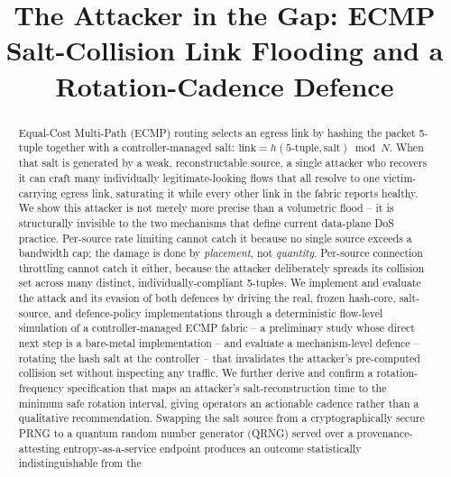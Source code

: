 \documentclass[conference]{IEEEtran}
\begin{document}
\title{The Attacker in the Gap: ECMP Salt-Collision Link Flooding and a Rotation-Cadence Defence}

\author{
}

\maketitle

\begin{abstract}
Equal-Cost Multi-Path (ECMP) routing selects an egress link by hashing the packet 5-tuple together with a
controller-managed salt: $\mathrm{link} = h(\mathrm{5\text{-}tuple}, \mathrm{salt}) \bmod N$. When that salt is
generated by a weak, reconstructable source, a single attacker who recovers it can craft many individually
legitimate-looking flows that all resolve to one victim-carrying egress link, saturating it while every other
link in the fabric reports healthy. We show this attacker is not merely more precise than a volumetric flood --
it is structurally invisible to the two mechanisms that define current data-plane DoS practice. Per-source rate
limiting cannot catch it because no single source exceeds a bandwidth cap; the damage is done by \emph{placement},
not \emph{quantity}. Per-source connection throttling cannot catch it either, because the attacker deliberately
spreads its collision set across many distinct, individually-compliant 5-tuples. We implement and evaluate the
attack and its evasion of both defences by driving the real, frozen hash-core, salt-source, and defence-policy
implementations through a deterministic flow-level simulation of a controller-managed ECMP fabric -- a
preliminary study whose direct next step is a bare-metal implementation -- and evaluate a mechanism-level
defence -- rotating the hash salt at the controller -- that invalidates the attacker's pre-computed collision
set without inspecting any traffic. We further derive and confirm a
rotation-frequency specification that maps an attacker's salt-reconstruction time to the minimum safe rotation
interval, giving operators an actionable cadence rather than a qualitative recommendation. Swapping the salt
source from a cryptographically secure PRNG to a quantum random number generator (QRNG) served over a
provenance-attesting entropy-as-a-service endpoint produces an outcome statistically indistinguishable from the

\end{abstract}
\end{document}
